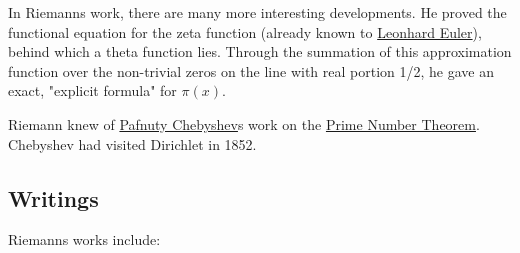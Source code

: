 In Riemann\textquotesingle s work, there are many more interesting developments. He proved the functional equation for the zeta function (already known to \href{https://en.wikipedia.org/wiki/Leonhard_Euler}{Leonhard Euler}), behind which a theta function lies. Through the summation of this approximation function over the non-trivial zeros on the line with real portion 1/2, he gave an exact, "explicit formula" for {{\(\pi(x)\)}{}}.

Riemann knew of \href{https://en.wikipedia.org/wiki/Pafnuty_Chebyshev}{Pafnuty Chebyshev}\textquotesingle s work on the \href{https://en.wikipedia.org/wiki/Prime_number_theorem}{Prime Number Theorem}. Chebyshev had visited Dirichlet in 1852.


\subsection{Writings}\label{Writings}

Riemann\textquotesingle s works include:

